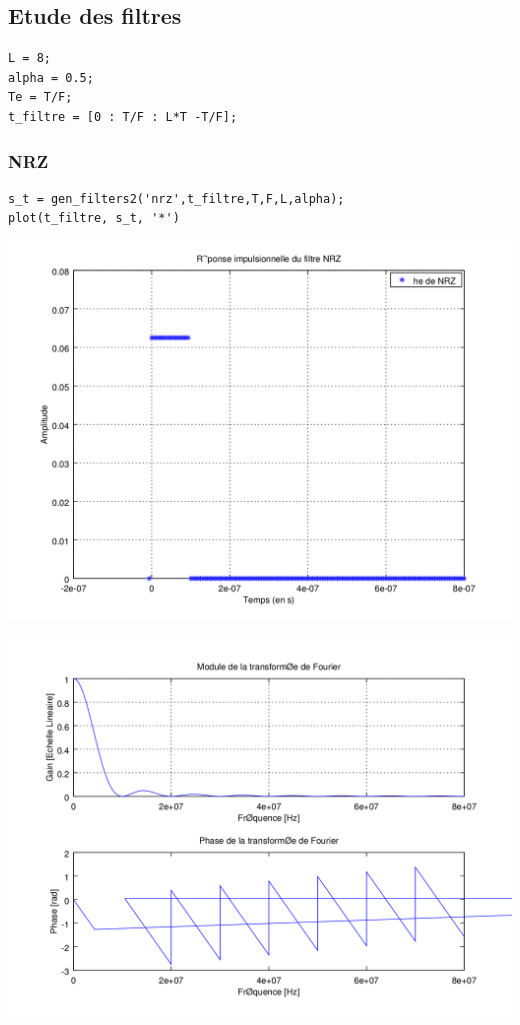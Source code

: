 \documentclass{acm_proc_article-sp}
\begin{document}
\subsection{Etude des filtres}

\begin{lstlisting}
L = 8;
alpha = 0.5;
Te = T/F;
t_filtre = [0 : T/F : L*T -T/F];
\end{lstlisting}

\subsubsection{NRZ}

\begin{lstlisting}
s_t = gen_filters2('nrz',t_filtre,T,F,L,alpha);
plot(t_filtre, s_t, '*')
\end{lstlisting}

\begin{center}
\includegraphics[scale=0.45]{NRZ_3.png}
\end{center}

\begin{center}
\includegraphics[scale=0.45]{NRZ_rep_3.png}
\end{center}
\end{document}
